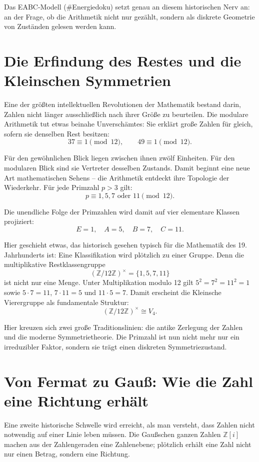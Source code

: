 \documentclass[11pt,a4paper]{scrartcl}
\begin{document}
Das EABC-Modell (\#Energiedoku) setzt genau an diesem historischen Nerv an: an der Frage, ob die Arithmetik nicht nur gezählt, sondern als diskrete Geometrie von Zuständen gelesen werden kann.

\section{Die Erfindung des Restes und die Kleinschen Symmetrien}

Eine der größten intellektuellen Revolutionen der Mathematik bestand darin, Zahlen nicht länger ausschließlich nach ihrer Größe zu beurteilen. Die modulare Arithmetik tut etwas beinahe Unverschämtes: Sie erklärt große Zahlen für gleich, sofern sie denselben Rest besitzen:
\[
37 \equiv 1 \pmod{12}, \qquad 49 \equiv 1 \pmod{12}.
\]

Für den gewöhnlichen Blick liegen zwischen ihnen zwölf Einheiten. Für den modularen Blick sind sie Vertreter desselben Zustands. Damit beginnt eine neue Art mathematischen Sehens – die Arithmetik entdeckt ihre Topologie der Wiederkehr. Für jede Primzahl $p > 3$ gilt:
\[
p \equiv 1, 5, 7 \text{ oder } 11 \pmod{12}.
\]

Die unendliche Folge der Primzahlen wird damit auf vier elementare Klassen projiziert:
\[
E = 1, \quad A = 5, \quad B = 7, \quad C = 11.
\]

Hier geschieht etwas, das historisch gesehen typisch für die Mathematik des 19. Jahrhunderts ist: Eine Klassifikation wird plötzlich zu einer Gruppe. Denn die multiplikative Restklassengruppe
\[
(\mathbb{Z}/12\mathbb{Z})^\times = \{1, 5, 7, 11\}
\]
ist nicht nur eine Menge. Unter Multiplikation modulo 12 gilt $5^2 = 7^2 = 11^2 = 1$ sowie $5 \cdot 7 = 11$, $7 \cdot 11 = 5$ und $11 \cdot 5 = 7$. Damit erscheint die Kleinsche Vierergruppe als fundamentale Struktur:
\[
(\mathbb{Z}/12\mathbb{Z})^\times \cong V_4.
\]

Hier kreuzen sich zwei große Traditionslinien: die antike Zerlegung der Zahlen und die moderne Symmetrietheorie. Die Primzahl ist nun nicht mehr nur ein irreduzibler Faktor, sondern sie trägt einen diskreten Symmetriezustand.

\section{Von Fermat zu Gauß: Wie die Zahl eine Richtung erhält}

Eine zweite historische Schwelle wird erreicht, als man versteht, dass Zahlen nicht notwendig auf einer Linie leben müssen. Die Gaußschen ganzen Zahlen $\mathbb{Z}[i]$ machen aus der Zahlengeraden eine Zahlenebene; plötzlich erhält eine Zahl nicht nur einen Betrag, sondern eine Richtung.
\end{document}
